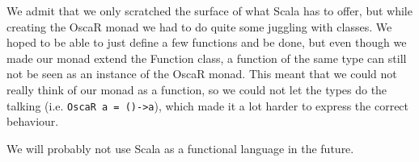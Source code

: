 \documentclass[a4paper]{article}
\begin{document}
We admit that we only scratched the surface of what Scala has to offer,
but while creating the OscaR monad we had to do quite some juggling with classes.
We hoped to be able to just define a few functions and be done, 
but even though we made our monad extend the Function class,
a function of the same type can still not be seen as an instance of the OscaR monad.
This meant that we could not really think of our monad as a function,
so we could not let the types do the talking (i.e. \verb|OscaR a = ()->a|),
which made it a lot harder to express the correct behaviour.

We will probably not use Scala as a functional language in the future.

\printbibliography
\end{document}
